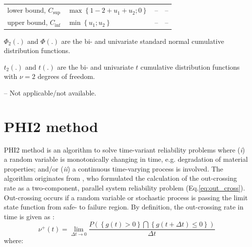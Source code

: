 \begin{table}
\begin{threeparttable}
\begin{tabular}{llll}
    lower bound, $C_\mathrm{sup}$  & $\max \left\{ {1 - 2 + {u_1} + {u_2};0} \right\}$ & -- & --  \\
    
    \rowcolor{lightgrey} upper bound, $C_\mathrm{inf}$  & $\min \left\{ {{u_1};{u_2}} \right\}$ & -- & --  \\
              
    \bottomrule
    \end{tabular}
    \begin{tablenotes}
    	\item $\Phi_2(.)$ and $\Phi(.)$  are the bi- and univariate standard normal cumulative distribution functions.
    	\item $t_2(.)$ and $t(.)$ are the bi- and univariate $t$ cumulative distribution functions with $\nu = 2$ degrees of freedom.
    	\item -- Not applicable/not available. 
   	\end{tablenotes}
   	\end{threeparttable}
\end{table}



\section{PHI2 method}

PHI2 method is an algorithm to solve time-variant reliability problems where (\textit{i}) a random variable is monotonically changing in time, e.g. degradation of material properties; and/or (\textit{ii}) a continuous time-varying process is involved. The algorithm originates from \citet{Hagen1991}, who formulated the calculation of the out-crossing rate as a two-component, parallel system reliability problem (Eq.\ref{eq:out_cross}).
Out-crossing occurs if a random variable or stochastic process is passing the limit state function from safe- to failure region. By definition, the out-crossing rate in time is given as \citep{Hagen1991}:
\begin{equation}
\label{eq:out_cross}
	{\nu ^ + }(t) = \mathop {\lim }\limits_{\Delta t \to 0} \frac{{P\left( {\left\{ {g(t) > 0} \right\}\bigcap {\left\{ {g(t + \Delta t) \le 0} \right\}} } \right)}}{{\Delta t}}
\end{equation}
where:

